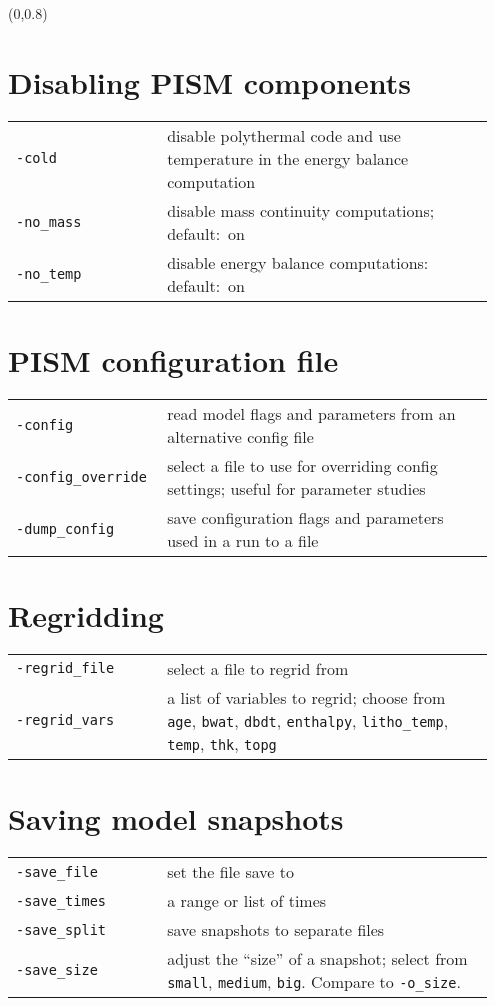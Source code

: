 \documentclass[landscape]{article}
\begin{document}
\begin{textblock}{15}(0,0.8)

\section{Disabling PISM components}
\label{sec:switches}
\begin{tabular}{@{}p{0.3\linewidth}p{0.65\linewidth}@{}}
\texttt{-cold} & disable polythermal code and use temperature in the energy
balance computation\\
\texttt{-no_mass} & disable mass continuity computations; \mbox{default: on}\\
\texttt{-no_temp} & disable energy balance computations: \mbox{default: on}
\end{tabular}

\section{PISM configuration file}
\label{sec:pism-config-file}
\begin{tabular}{@{}p{0.3\linewidth}p{0.65\linewidth}@{}}
\texttt{-config} & read model flags and parameters from an alternative config file\\
\texttt{-config_override} & select a file to use for overriding config
settings; useful for parameter studies\\
\texttt{-dump_config} & save configuration flags and parameters used in a run to a file
\end{tabular}

\section{Regridding}
\label{sec:regridding}
\begin{tabular}{@{}p{0.3\linewidth}p{0.65\linewidth}@{}}
  \texttt{-regrid_file} & select a file to regrid from\\
  \texttt{-regrid_vars} & a list of variables to regrid; choose from
  \texttt{age}, \texttt{bwat}, \texttt{dbdt}, \texttt{enthalpy}, \texttt{litho_temp}, \texttt{temp},
  \texttt{thk}, \texttt{topg}\\
\end{tabular}

\section{Saving model snapshots}
\label{sec:snapshots}
\begin{tabular}{@{}p{0.3\linewidth}p{0.65\linewidth}@{}}
\texttt{-save_file} & set the file save to\\
\texttt{-save_times} & a range or list of times\\
\texttt{-save_split} & save snapshots to separate files\\
\texttt{-save_size} & adjust the ``size'' of a snapshot; select from
\texttt{small}, \texttt{medium}, \texttt{big}. Compare to \texttt{-o_size}.
\end{tabular}


\end{textblock}
\end{document}
